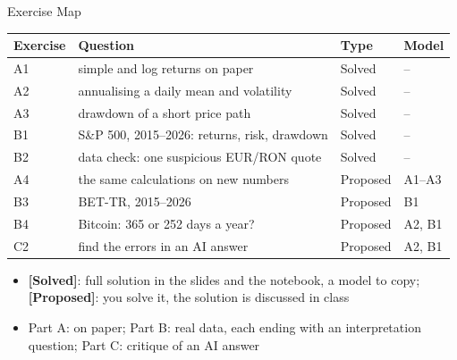 \begin{frame}{Exercise Map}
\itemsize{\footnotesize}
\begin{center}
\footnotesize
\begin{tabular}{l>{\raggedright\arraybackslash}p{6.4cm}ll}
\toprule
\textbf{Exercise} & \textbf{Question} & \textbf{Type} & \textbf{Model} \\
\midrule
A1 & simple and log returns on paper & Solved & -- \\
A2 & annualising a daily mean and volatility & Solved & -- \\
A3 & drawdown of a short price path & Solved & -- \\
B1 & S\&P 500, 2015--2026: returns, risk, drawdown & Solved & -- \\
B2 & data check: one suspicious EUR/RON quote & Solved & -- \\
A4 & the same calculations on new numbers & Proposed & A1--A3 \\
B3 & BET-TR, 2015--2026 & Proposed & B1 \\
B4 & Bitcoin: 365 or 252 days a year? & Proposed & A2, B1 \\
C2 & find the errors in an AI answer & Proposed & A2, B1 \\
\bottomrule
\end{tabular}
\end{center}
\begin{itemize}
    \item \textbf{[Solved]}: full solution in the slides and the notebook, a model to copy; \textbf{[Proposed]}: you solve it, the solution is discussed in class
    \item Part A: on paper; Part B: real data, each ending with an interpretation question; Part C: critique of an AI answer
\end{itemize}
\end{frame}

